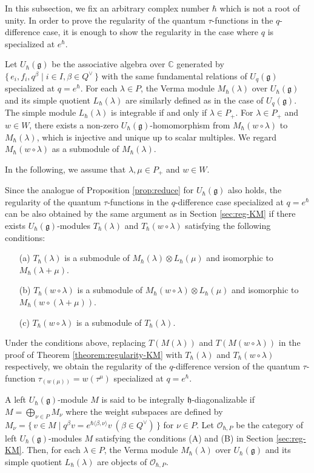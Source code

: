 \documentclass[12pt,twoside]{article}
\newcommand\bra{\langle}
\newcommand\ket{\rangle}
\renewcommand\O{{\mathcal O}}
\newcommand\Qv{Q^\vee}
\newcommand\g{{\mathfrak g}}
\newcommand\h{{\mathfrak h}}
\newcommand\intpart{P}
\newcommand\Ointh{\O_{\hbar,\intpart}}
\newcommand\C{{\mathbb C}} %
\theoremstyle{plain} %
\theoremstyle{definition} %
\theoremstyle{definition} %
\numberwithin{theorem}{section}
\numberwithin{equation}{section}
\numberwithin{figure}{section}
\numberwithin{table}{section}
\newcommand\secref[1]{Section \ref{#1}}
\newcommand\theoremref[1]{Theorem \ref{#1}}
\newcommand\propref[1]{Proposition \ref{#1}}
\begin{document}
In this subsection, we fix an arbitrary complex number $\hbar$ which is not a root of unity.
In order to prove the regularity of the quantum $\tau$-functions
in the $q$-difference case, it is enough to show 
the regularity in the case where $q$ is specialized at $e^\hbar$.

Let $U_\hbar(\g)$ be the associative algebra over $\C$ generated by 
$\{\,e_i,f_i,q^\beta\mid i\in I, \beta\in\Qv \,\}$ with the same fundamental
relations of $U_q(\g)$ specialized at $q=e^\hbar$. 
For each $\lambda\in P$, the Verma module $M_\hbar(\lambda)$ over $U_\hbar(\g)$ and 
its simple quotient $L_\hbar(\lambda)$ are similarly defined 
as in the case of $U_q(\g)$.
The simple module $L_\hbar(\lambda)$ is integrable if and only if $\lambda\in P_+$.
For $\lambda\in P_+$ and $w\in W$, there exists a non-zero $U_\hbar(\g)$-homomorphism 
from $M_\hbar(w\circ\lambda)$ to $M_\hbar(\lambda)$,  
which is injective and unique up to scalar multiples.
We regard $M_\hbar(w\circ\lambda)$ as a submodule of $M_\hbar(\lambda)$.

In the following, we assume that $\lambda,\mu\in P_+$ and $w\in W$.

Since the analogue of \propref{prop:reduce} for $U_\hbar(\g)$ also holds,
the regularity of the quantum $\tau$-functions in the $q$-difference case
specialized at $q=e^\hbar$ can be also obtained by the same argument 
as in \secref{sec:reg-KM} 
if there exists $U_\hbar(\g)$-modules $T_\hbar(\lambda)$ and $T_\hbar(w\circ\lambda)$
satisfying the following conditions:
\begin{enumerate}
\item[(a)] $T_\hbar(\lambda)$ is a submodule 
  of $M_\hbar(\lambda)\otimes L_\hbar(\mu)$
  and isomorphic to $M_\hbar(\lambda+\mu)$.
\item[(b)] $T_\hbar(w\circ\lambda)$ is a submodule 
  of $M_\hbar(w\circ\lambda)\otimes L_\hbar(\mu)$
  and isomorphic to $M_\hbar(w\circ(\lambda+\mu))$.
\item[(c)] $T_\hbar(w\circ\lambda)$ is a submodule of $T_\hbar(\lambda)$.
\end{enumerate}
Under the conditions above, replacing $T(M(\lambda))$ and $T(M(w\circ\lambda))$
in the proof of \theoremref{theorem:regularity-KM} 
with $T_\hbar(\lambda)$ and $T_\hbar(w\circ\lambda)$ respectively, 
we obtain the regularity of the $q$-difference version of 
the quantum $\tau$-function $\tau_{(w(\mu))}=w(\tau^\mu)$ specialized at $q=e^\hbar$.

A left $U_\hbar(\g)$-module $M$ is said to be integrally $\h$-diagonalizable 
if $M=\bigoplus_{\nu\in P}M_\nu$ where the weight subspaces are defined 
by $M_\nu=\{\,v\in M\mid q^\beta v=e^{\hbar\bra\beta,\nu\ket}v\ (\beta\in\Qv) \,\}$
for $\nu\in P$.
Let $\Ointh$ be the category of left $U_\hbar(\g)$-modules $M$ satisfying 
the conditions (A) and (B) in \secref{sec:reg-KM}.
Then, for each $\lambda\in P$, the Verma module $M_\hbar(\lambda)$ over $U_\hbar(\g)$ 
and its simple quotient $L_\hbar(\lambda)$ are objects of $\Ointh$.
\end{document}
